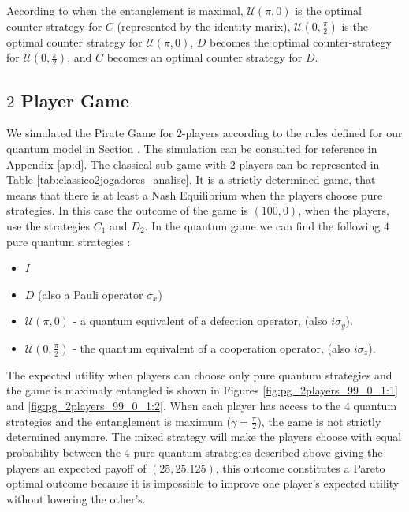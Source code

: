 \documentclass[10pt,twocolumn]{llncs}
\begin{document}
According to \cite{Du} when the entanglement is maximal, $\mathcal{U}(\pi, 0)$ is the optimal counter-strategy for $C$ (represented by the identity marix), $\mathcal{U}(0, \frac{\pi}{2})$ is the optimal counter strategy for $\mathcal{U}(\pi, 0)$, $D$ becomes the optimal counter-strategy for $\mathcal{U}(0, \frac{\pi}{2})$, and $C$ becomes an optimal counter strategy for $D$. 

\subsection{$2$ Player Game}
\label{subsec:2playergame}

We simulated the Pirate Game for $2$-players according to the rules defined for our quantum model in Section . The simulation can be consulted for reference in Appendix \ref{ap:d}. The classical sub-game with $2$-players can be represented in Table \ref{tab:classico2jogadores_analise}. It is a strictly determined game, that means that there is at least a Nash Equilibrium when the players choose pure strategies\cite{Leyton-Brown2008:Essentials_Game_Theory}. In this case the outcome of the game is $(100, 0)$, when the players, use the strategies $C_{1}$ and $D_{2}$.  In the quantum game we can find the following $4$ pure quantum strategies :

\begin{itemize}

\item $I$

\item $D$ (also a Pauli operator $\sigma_{x}$)

\item $\mathcal{U}( \pi, 0)$ - a quantum equivalent of a defection operator, (also $i \sigma_y$).

\item $\mathcal{U}( 0, \frac{\pi}{2})$ - the quantum equivalent of a cooperation operator, (also $i \sigma_z$).

\end{itemize}

The expected utility when players can choose only pure quantum strategies and the game is maximaly entangled is shown in Figures \ref{fig:pg_2players_99_0_1:1} and \ref{fig:pg_2players_99_0_1:2}. When each player has access to the $4$ quantum strategies and the entanglement is maximum ($\gamma=\frac{\pi}{2}$), the game is not strictly determined anymore. The mixed strategy will make the players choose with equal probability between the 4 pure quantum strategies described above giving the players an expected payoff of $(25, 25.125)$, this outcome constitutes a Pareto optimal outcome because it is impossible to improve one player's expected utility without lowering the other's. 
\end{document}
